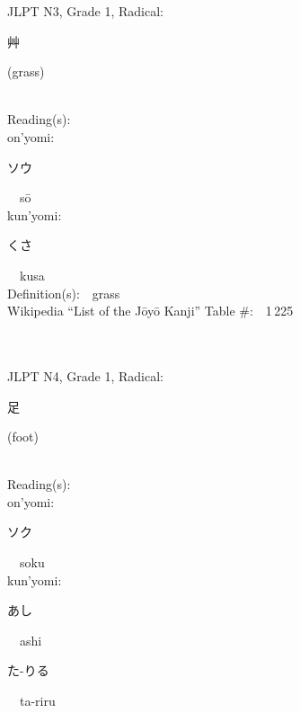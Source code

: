 \begin{multicols}{2}
{JLPT N3, Grade 1, Radical:\ \ {\begin{CJK}{UTF8}{min} 艸 \end{CJK}} (grass) } \\
Reading(s):\ \ \\
{\hspace*{1em}}on'yomi:\ \ \\
{\hspace*{2em}}{\begin{CJK}{UTF8}{min} ソウ \end{CJK}}\ \ s\=o\ \ \\
{\hspace*{1em}}kun'yomi:\ \ \\
{\hspace*{2em}}{\begin{CJK}{UTF8}{min} くさ \end{CJK}}\ \ kusa\ \ \\
Definition(s):\ \ grass \\
Wikipedia ``List of the J\=oy\=o Kanji'' Table \#:\ \ 1\,225 \\
\ \ \\
{\fontsize{34pt}{40pt}  }\ \ \\  %
{JLPT N4, Grade 1, Radical:\ \ {\begin{CJK}{UTF8}{min} 足 \end{CJK}} (foot) } \\
Reading(s):\ \ \\
{\hspace*{1em}}on'yomi:\ \ \\
{\hspace*{2em}}{\begin{CJK}{UTF8}{min} ソク \end{CJK}}\ \ soku\ \ \\
{\hspace*{1em}}kun'yomi:\ \ \\
{\hspace*{2em}}{\begin{CJK}{UTF8}{min} あし \end{CJK}}\ \ ashi\ \ \\
{\hspace*{2em}}{\begin{CJK}{UTF8}{min} た-りる \end{CJK}}\ \ ta-riru\ \ \\

\end{multicols}
